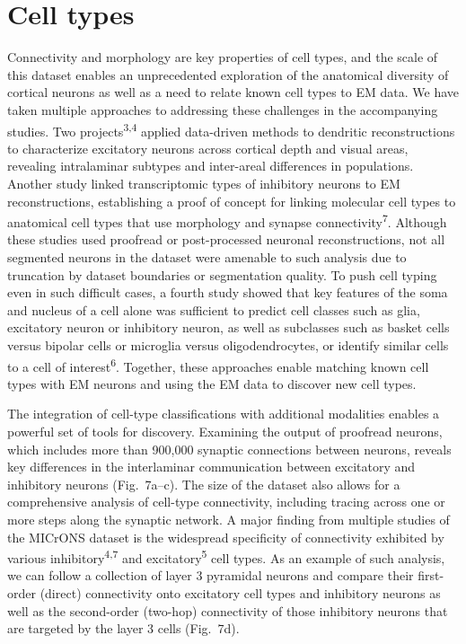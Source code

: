 \documentclass{article}
\begin{document}
\section*{Cell types}

Connectivity and morphology are key properties of cell types, and the scale of this dataset enables an unprecedented exploration of the anatomical diversity of cortical neurons as well as a need to relate known cell types to EM data. We have taken multiple approaches to addressing these challenges in the accompanying studies. Two projects\textsuperscript{3,4} applied data-driven methods to dendritic reconstructions to characterize excitatory neurons across cortical depth and visual areas, revealing intralaminar subtypes and inter-areal differences in populations. Another study linked transcriptomic types of inhibitory neurons to EM reconstructions, establishing a proof of concept for linking molecular cell types to anatomical cell types that use morphology and synapse connectivity\textsuperscript{7}. Although these studies used proofread or post-processed neuronal reconstructions, not all segmented neurons in the dataset were amenable to such analysis due to truncation by dataset boundaries or segmentation quality. To push cell typing even in such difficult cases, a fourth study showed that key features of the soma and nucleus of a cell alone was sufficient to predict cell classes such as glia, excitatory neuron or inhibitory neuron, as well as subclasses such as basket cells versus bipolar cells or microglia versus oligodendrocytes, or identify similar cells to a cell of interest\textsuperscript{6}. Together, these approaches enable matching known cell types with EM neurons and using the EM data to discover new cell types.

The integration of cell-type classifications with additional modalities enables a powerful set of tools for discovery. Examining the output of proofread neurons, which includes more than 900,000 synaptic connections between neurons, reveals key differences in the interlaminar communication between excitatory and inhibitory neurons (Fig.~7a–c). The size of the dataset also allows for a comprehensive analysis of cell-type connectivity, including tracing across one or more steps along the synaptic network. A major finding from multiple studies of the MICrONS dataset is the widespread specificity of connectivity exhibited by various inhibitory\textsuperscript{4,7} and excitatory\textsuperscript{5} cell types. As an example of such analysis, we can follow a collection of layer 3 pyramidal neurons and compare their first-order (direct) connectivity onto excitatory cell types and inhibitory neurons as well as the second-order (two-hop) connectivity of those inhibitory neurons that are targeted by the layer 3 cells (Fig.~7d).
\end{document}

